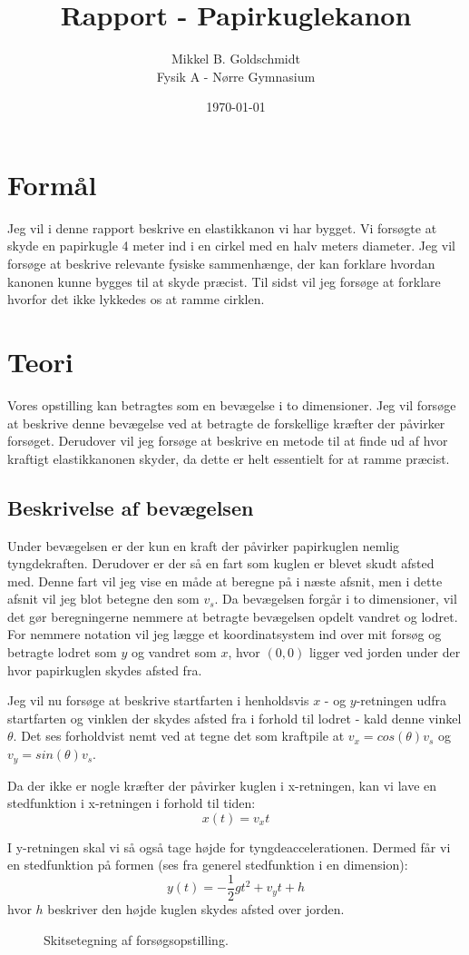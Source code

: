 \documentclass[12pt,a4paper]{article}
\author{Mikkel B. Goldschmidt \\ Fysik A - Nørre Gymnasium}
\title{Rapport - Papirkuglekanon}
\date{\today}
\theoremstyle{break}
\theoremstyle{nonumberplain}
\begin{document}
\maketitle

\section{Formål}
Jeg vil i denne rapport beskrive en elastikkanon vi har bygget. 
Vi forsøgte at skyde en papirkugle 4 meter ind i en cirkel med en halv meters diameter.
Jeg vil forsøge at beskrive relevante fysiske sammenhænge, der kan forklare hvordan kanonen kunne bygges til at skyde præcist. 
Til sidst vil jeg forsøge at forklare hvorfor det ikke lykkedes os at ramme cirklen.

\section{Teori}
Vores opstilling kan betragtes som en bevægelse i to dimensioner.
Jeg vil forsøge at beskrive denne bevægelse ved at betragte de forskellige kræfter der påvirker forsøget.
Derudover vil jeg forsøge at beskrive en metode til at finde ud af hvor kraftigt elastikkanonen skyder, da dette er helt essentielt for at ramme præcist.

\subsection{Beskrivelse af bevægelsen}
Under bevægelsen er der kun en kraft der påvirker papirkuglen nemlig tyngdekraften.
Derudover er der så en fart som kuglen er blevet skudt afsted med.
Denne fart vil jeg vise en måde at beregne på i næste afsnit, men i dette afsnit vil jeg blot betegne den som $v_s$.
Da bevægelsen forgår i to dimensioner, vil det gør beregningerne nemmere at betragte bevægelsen opdelt vandret og lodret.
For nemmere notation vil jeg lægge et koordinatsystem ind over mit forsøg og betragte lodret som $y$ og vandret som $x$, hvor $(0,0)$ ligger ved jorden under der hvor papirkuglen skydes afsted fra.

Jeg vil nu forsøge at beskrive startfarten i henholdsvis $x$
- og $y$-retningen udfra startfarten og vinklen der skydes afsted fra i forhold til lodret - kald denne vinkel $\theta$.
Det ses forholdvist nemt ved at tegne det som kraftpile at $v_x = cos(\theta )v_s$ og $v_y = sin(\theta )v_s$.

Da der ikke er nogle kræfter der påvirker kuglen i x-retningen, kan vi lave en stedfunktion i x-retningen i forhold til tiden: $$x(t) = v_x t$$

I y-retningen skal vi så også tage højde for tyngdeaccelerationen.
Dermed får vi en stedfunktion på formen (ses fra generel stedfunktion i en dimension): $$y(t)=-\frac{1}{2}gt^2+v_yt+h$$
hvor $h$ beskriver den højde kuglen skydes afsted over jorden.
\begin{figure}[h]
\center
\caption{Skitsetegning af forsøgsopstilling.}
\end{figure}
\end{document}
